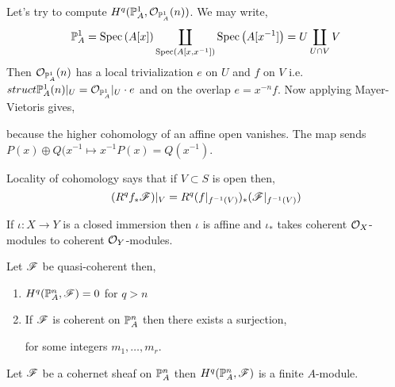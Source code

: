 \documentclass[12pt]{article}
\begin{document}
\begin{example}
Let's try to compute $H^q(\P_A^1, \struct{\P_A^1}(n))$. We may write,
\[ \P_A^1 = \Spec{A[x]} \coprod_{\Spec{A[x, x^{-1}]}} \Spec{A[x^{-1}]} = U \coprod_{U \cap V} V \]
Then $\struct{\P_A^1}(n)$ has a local trivialization $e$ on $U$ and $f$ on $V$ i.e. $struct{\P_A^1}(n)|_U = \struct{\P_A^1} |_U \cdot e$ and on the overlap $e = x^{-n} f$. Now applying Mayer-Vietoris gives,
\begin{center}
\end{center}
because the higher cohomology of an affine open vanishes. 
The map sends $P(x) \oplus Q(x^{-1} \mapsto x^{-1} P(x) = Q(x^{-1})$.  
\end{example}

\begin{remark}
Locality of cohomology says that if $V \subset S$ is open then,
\[ (R^q f_* \F)|_V = R^q(f|_{f^{-1}(V)})_* (\F|_{f^{-1}(V)}) \]
\end{remark}

\begin{lemma}
If $\iota : X \to Y$ is a closed immersion then $\iota$ is affine and $\iota_*$ takes coherent $\struct{X}$-modules to coherent $\struct{Y}$-modules. 
\end{lemma}

\begin{proposition}
Let $\F$ be quasi-coherent then,
\begin{enumerate}
\item $H^q(\P_A^n, \F) = 0$ for $q > n$ 
\item If $\F$ is coherent on $\P_A^n$ then there exists a surjection,
\begin{center}
\end{center}
for some integers $m_1, \dots, m_r$. 
\end{enumerate}
\end{proposition}

\begin{theorem}
Let $\F$ be a cohernet sheaf on $\P_A^n$ then $H^q(\P_A^n, \F)$ is a finite $A$-module.
\end{theorem}
\end{document}
